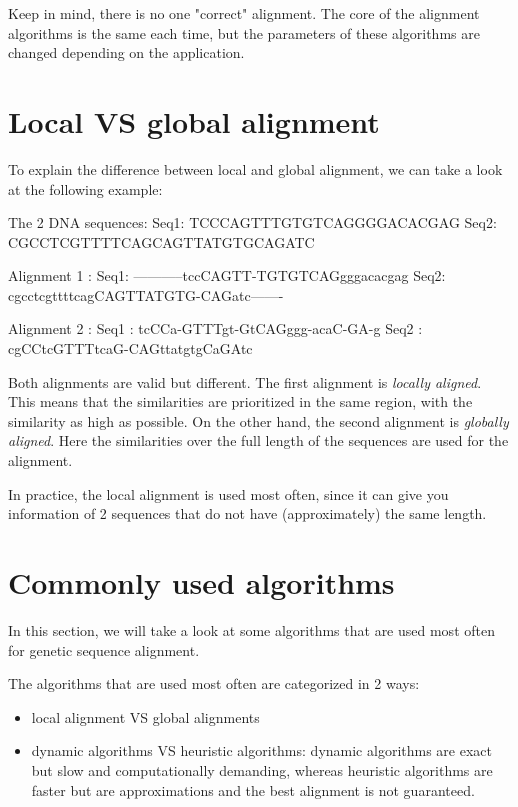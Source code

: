 Keep in mind, there is no one "correct" alignment. The core of the alignment algorithms is the same each time, but the parameters of these algorithms are changed depending on the application.

\section{Local VS global alignment}

To explain the difference between local and global alignment, we can take a look at the following example:

\begin{lcverbatim}
	The 2 DNA sequences:
	Seq1: TCCCAGTTTGTGTCAGGGGACACGAG
	Seq2: CGCCTCGTTTTCAGCAGTTATGTGCAGATC
	
	Alignment 1 :
	Seq1: -----------tccCAGTT-TGTGTCAGgggacacgag
	Seq2: cgcctcgttttcagCAGTTATGTG-CAGatc-------
	
	Alignment 2 :
	Seq1 : tcCCa-GTTTgt-GtCAGggg-acaC-GA-g
	Seq2 : cgCCtcGTTTtcaG-CAGttatgtgCaGAtc
\end{lcverbatim}

Both alignments are valid but different. The first alignment is \emph{locally aligned}. This means that the similarities are prioritized in the same region, with the similarity as high as possible. On the other hand, the second alignment is \emph{globally aligned}. Here the similarities over the full length of the sequences are used for the alignment. 

In practice, the local alignment is used most often, since it can give you information of 2 sequences that do not have (approximately) the same length.

\section{Commonly used algorithms}

In this section, we will take a look at some algorithms that are used most often for genetic sequence alignment.


The algorithms that are used most often are categorized in 2 ways: 

\begin{itemize}
	\item local alignment VS global alignments
	\item dynamic algorithms VS heuristic algorithms: dynamic algorithms are exact but slow and computationally demanding, whereas heuristic algorithms are faster but are approximations and the best alignment is not guaranteed.
\end{itemize}

